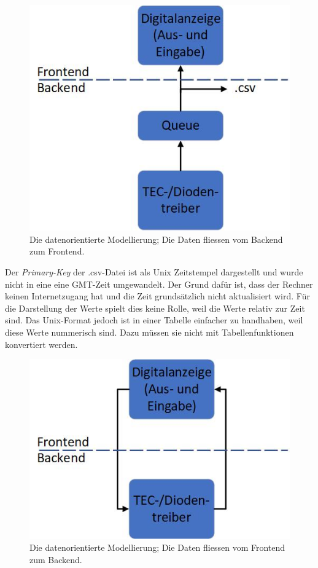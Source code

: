 \begin{figure}[H]
    \centering
    \includegraphics[scale=0.6]{98_images/data_oriented_back_front.jpg}
    \caption{Die datenorientierte Modellierung; Die Daten fliessen vom Backend zum Frontend.}
    \label{fig:dataflow_1}
\end{figure}

Der \textit{Primary-Key} der .csv-Datei ist als Unix Zeitstempel dargestellt und wurde nicht in eine eine GMT-Zeit umgewandelt. Der Grund dafür ist, dass der Rechner keinen Internetzugang hat und die Zeit grundsätzlich nicht aktualisiert wird. Für die Darstellung der Werte spielt dies keine Rolle, weil die Werte relativ zur Zeit sind. Das Unix-Format jedoch ist in einer Tabelle einfacher zu handhaben, weil diese Werte nummerisch sind. Dazu müssen sie nicht mit Tabellenfunktionen konvertiert werden.\\

\begin{figure}[H]
    \centering
    \includegraphics[scale=0.6]{98_images/data_oriented_front_back.jpg}
    \caption{Die datenorientierte Modellierung; Die Daten fliessen vom Frontend zum Backend.}
    \label{fig:dataflow_2}
\end{figure}

